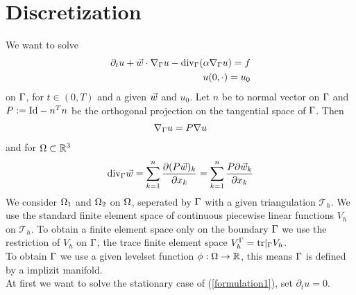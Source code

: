 \section{Discretization}
We want to solve 
\begin{subequations}
\label{formulation1}
\begin{align}
\partial_t u + \vec w \cdot \nabla_\Gamma u - \text{div}_\Gamma(\alpha \nabla_\Gamma u)=f \\
u(0,\cdot)=u_0
\end{align}
\end{subequations}
on $\Gamma$, for $t\in(0,T)$ and a given $\vec w$ and $u_0$. Let $n$ be to normal vector on $\Gamma$ and  $P:=\text{Id}-n^Tn$ be the orthogonal projection on the tangential space of $\Gamma$. Then
\begin{align} 
\label{napG}
\nabla_\Gamma u=P\nabla u
\end{align}
 and for $\Omega \subset \mathbb{R}^3$
\begin{align}
\label{divG}
\text{div}_\Gamma \vec w = \sum_{k=1}^n \frac{\partial (P \vec w)_k}{\partial x_k}
= \sum_{k=1}^n \frac{P \partial \vec w_k}{\partial x_k}
\end{align}
We consider $\Omega_1$ and $\Omega_2$ on $\Omega$, seperated  by $\Gamma$ with a given triangulation $\mathcal{T}_h$. We use the standard finite element space of continuous piecewise linear functions $V_h$ on $\mathcal{T}_h$. To obtain a finite element space only on the boundary $\Gamma$ we use the restriction of $V_h$ on $\Gamma$, the trace finite element space $V^\Gamma_h=\text{tr}|_\Gamma V_h$.\\
To obtain $\Gamma$ we use a given levelset function $\phi:\Omega \to \mathbb{R}$, this means $\Gamma$ is defined by a implizit manifold.\\
At first we want to solve the stationary case of (\ref{formulation1}), set $\partial_t u=0$.
